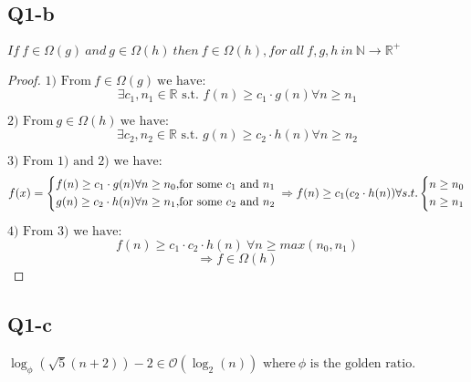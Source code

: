 \documentclass{article}
\begin{document}
\newpage

\subsection*{Q1-b}

$ If\ f \in \Omega(g)\ and\ g \in \Omega(h)\ then\ f \in \Omega(h), for\ all\ f, g, h\ in\ \mathbb{N} \rightarrow \mathbb{R^+} $

\begin{proof}

    \text{\newline}

    $ \text{1) From} \ f \in \Omega(g) \ \text{we have: } $
    $$ \exists c_1, n_1 \in \mathbb{R} \text{ s.t. } f(n) \geq c_1 \cdot g(n) \forall n \geq n_1 $$

    $ \text{2) From} \ g \in \Omega(h) \ \text{we have: } $
    $$ \exists c_2, n_2 \in \mathbb{R} \text{ s.t. } g(n) \geq c_2 \cdot h(n) \forall n \geq n_2 $$

    $ \text{3) From 1) \ and\ 2) \ we\ have: }$
    $$ f(x)=\left\{
        \begin{aligned}
            f(n) \geq c_1 \cdot g(n) \forall n \geq n_0, & \text{for some $c_1$ and $n_1$} \\
            g(n) \geq c_2 \cdot h(n) \forall n \geq n_1, & \text{for some $c_2$ and $n_2$} \\
        \end{aligned}
        \right.\\
        \Rightarrow
        \begin{aligned}
            f(n) \geq c_1 ( c_2 \cdot h(n) ) \forall s.t.
            \left\{
            \begin{aligned}
                n \geq n_0 \\
                n \geq n_1 \\
            \end{aligned}
            \right.
        \end{aligned}
    $$

    $ \text{4) From 3) \ we\ have: }$
    $$ f(n) \geq c_1 \cdot c_2 \cdot h(n)\ \forall n \geq max(n_0, n_1) $$
    $$ \Rightarrow f \in \Omega(h) $$

\end{proof}

\newpage

\subsection*{Q1-c}
$ \log_\phi(\sqrt{5}(n+2)) - 2 \in \mathcal{O}(\log_2(n)) $
$ \text{where} \ \phi \text{ is the golden ratio.} $
\end{document}
